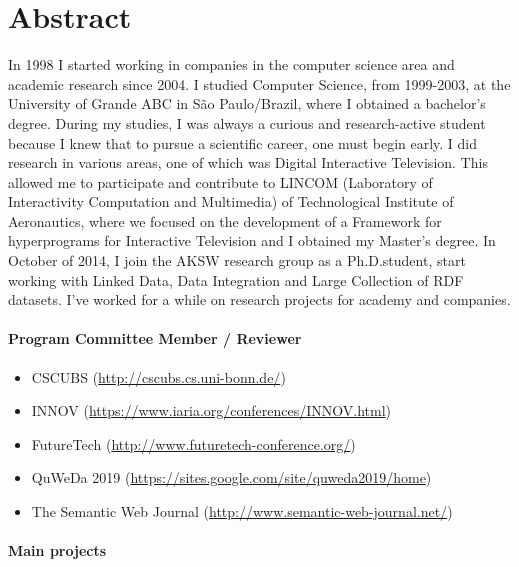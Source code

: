 \section{Abstract}
In 1998 I started working in companies in the computer science area and academic research since 2004.
I studied Computer Science, from 1999-2003, at the University of Grande ABC in São Paulo/Brazil, where I obtained a bachelor's degree. During my studies, I was always a curious and research-active student because I knew that to pursue a scientific career, one must begin early. I did research in various areas, one of which was Digital Interactive Television. This allowed me to participate and contribute to LINCOM (Laboratory of Interactivity Computation and Multimedia) of Technological Institute of Aeronautics, where we focused on the development of a Framework for hyperprograms for Interactive Television and I obtained my Master's degree.
In October of 2014, I join the AKSW research group as a Ph.D.student, start working with Linked Data, Data Integration and Large Collection of RDF datasets. I've worked for a while on research projects for academy and companies. 

\paragraph{Program Committee Member / Reviewer}
\begin{itemize}
    \item CSCUBS (\url{http://cscubs.cs.uni-bonn.de/})
    \item INNOV (\url{https://www.iaria.org/conferences/INNOV.html})
    \item FutureTech (\url{http://www.futuretech-conference.org/})
    \item QuWeDa 2019 (\url{https://sites.google.com/site/quweda2019/home})   
    \item The Semantic Web Journal (\url{http://www.semantic-web-journal.net/})
\end{itemize}

\paragraph{Main projects}

